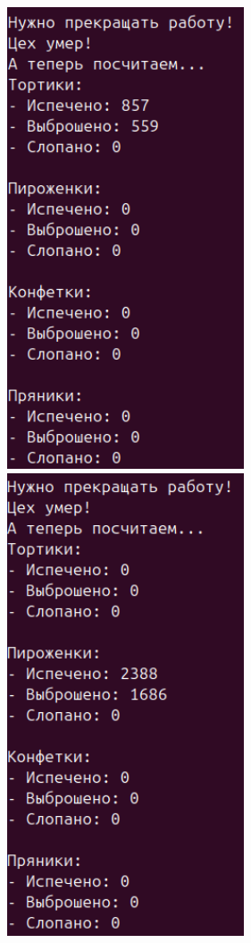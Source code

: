 \documentclass[a4paper,14pt]{extarticle}
\begin{document}
\includegraphics[width=70mm]{processes_output_3_1}
\includegraphics[width=70mm]{processes_output_3_2}
\end{document}
